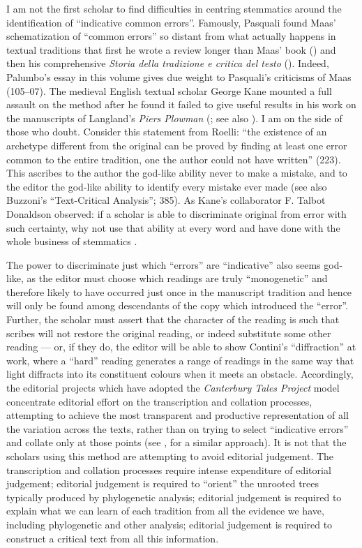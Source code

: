\begin{review}
I am not the first scholar to find difficulties in centring
stemmatics around the identification of ``indicative common errors''.
Famously, Pasquali found Maas' schematization of ``common errors'' so
distant from what actually happens in textual traditions that first he
wrote a review longer than Maas' book (\citeyear{pasquali_paul_1929}) and then his comprehensive
\emph{Storia della tradizione e critica del testo} (\citeyear{pasquali_storia_1934}). Indeed,
Palumbo's essay in this volume gives due weight to Pasquali's criticisms
of Maas (105--07). The medieval English textual scholar George Kane
mounted a full assault on the method after he found it failed to give
useful results in his work on the manuscripts of Langland's \emph{Piers
Plowman} (\cite{kane_john_1984}; see also \cite{langland_piers_1960,langland_piers_1975}). I am on the side of
those who doubt. Consider this statement from Roelli: ``the existence of
an archetype different from the original can be proved by finding at
least one error common to the entire tradition, one the author could not
have written'' (223). This ascribes to the author the god-like ability
never to make a mistake, and to the editor the god-like ability to
identify every mistake ever made (see also Buzzoni's ``Text-Critical
Analysis''; 385). As Kane's collaborator F. Talbot Donaldson observed:
if a scholar is able to discriminate original from error with such
certainty, why not use that ability at every word and have done with the
whole business of stemmatics \parencite[107]{donaldson_psychology_1970}.

The power to discriminate just which ``errors'' are ``indicative'' also
seems god-like, as the editor must choose which readings are truly
``monogenetic'' and therefore likely to have occurred just once in the
manuscript tradition and hence will only be found among descendants of
the copy which introduced the ``error''. Further, the scholar must
assert that the character of the reading is such that scribes will not
restore the original reading, or indeed substitute some other reading
–– or, if they do, the editor will be able to show Contini's
``diffraction'' at work, where a ``hard'' reading generates a range of
readings in the same way that light diffracts into its constituent
colours when it meets an obstacle. Accordingly, the editorial projects
which have adopted the \emph{Canterbury Tales Project} model concentrate
editorial effort on the transcription and collation processes,
attempting to achieve the most transparent and productive representation
of all the variation across the texts, rather than on trying to select
``indicative errors'' and collate only at those points (see \cite{andrews_analysis_2016}, for a similar approach). It is not that the scholars using this
method are attempting to avoid editorial judgement. The transcription
and collation processes require intense expenditure of editorial
judgement; editorial judgement is required to ``orient'' the unrooted
trees typically produced by phylogenetic analysis; editorial judgement
is required to explain what we can learn of each tradition from all the
evidence we have, including phylogenetic and other analysis; editorial
judgement is required to construct a critical text from all this
information.


\end{review}
